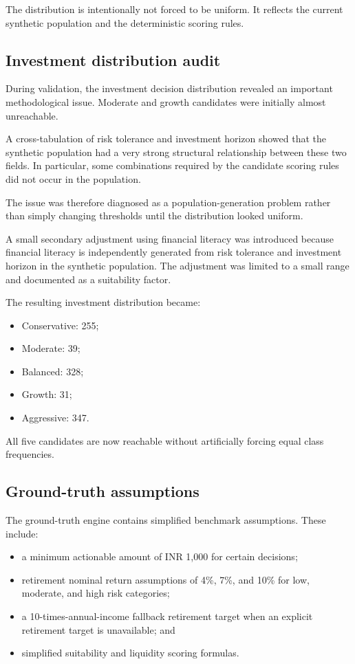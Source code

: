 \documentclass[12pt,a4paper]{article}
\begin{document}
The distribution is intentionally not forced to be uniform. It reflects the current synthetic population and the deterministic scoring rules.

\subsection{Investment distribution audit}

During validation, the investment decision distribution revealed an important methodological issue. Moderate and growth candidates were initially almost unreachable.

A cross-tabulation of risk tolerance and investment horizon showed that the synthetic population had a very strong structural relationship between these two fields. In particular, some combinations required by the candidate scoring rules did not occur in the population.

The issue was therefore diagnosed as a population-generation problem rather than simply changing thresholds until the distribution looked uniform.

A small secondary adjustment using financial literacy was introduced because financial literacy is independently generated from risk tolerance and investment horizon in the synthetic population. The adjustment was limited to a small range and documented as a suitability factor.

The resulting investment distribution became:

\begin{itemize}
    \item Conservative: 255;
    \item Moderate: 39;
    \item Balanced: 328;
    \item Growth: 31;
    \item Aggressive: 347.
\end{itemize}

All five candidates are now reachable without artificially forcing equal class frequencies.

\subsection{Ground-truth assumptions}

The ground-truth engine contains simplified benchmark assumptions. These include:
\begin{itemize}
    \item a minimum actionable amount of INR 1,000 for certain decisions;
    \item retirement nominal return assumptions of 4\%, 7\%, and 10\% for low, moderate, and high risk categories;
    \item a 10-times-annual-income fallback retirement target when an explicit retirement target is unavailable; and
    \item simplified suitability and liquidity scoring formulas.
\end{itemize}
\end{document}
